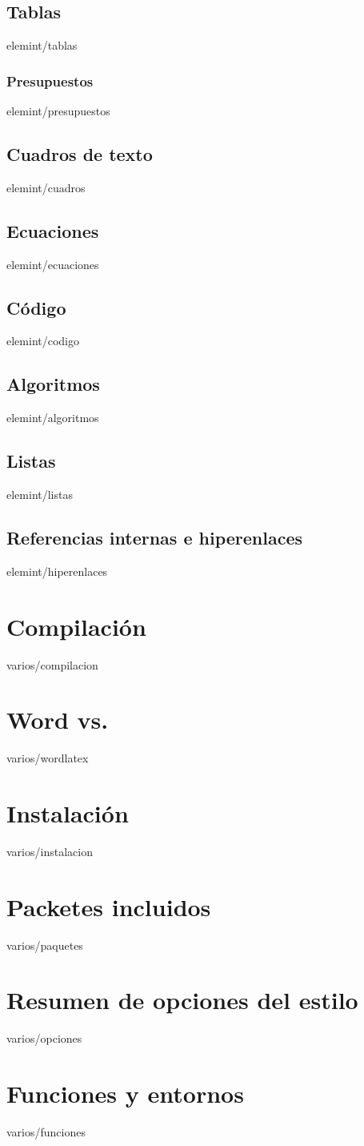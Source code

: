 \documentclass[epsbased,copyright,final,printable,covers,extendedindex,firstnumbered,tfg,gnuplot]{tfgtfmthesisuam}
\begin{document}
  \section{Tablas\label{SEC:TABLAS}}{elemint/tablas}
    \subsection{Presupuestos\label{SS:PRESUPUESTOS}}{elemint/presupuestos}
  \section{Cuadros de texto\label{SEC:CUADROS}}{elemint/cuadros}
  \section{Ecuaciones\label{SEC:ECUACIONES}}{elemint/ecuaciones}
  \section{Código\label{SEC:CODIGO}}{elemint/codigo}
  \section{Algoritmos\label{SEC:ALGORITMOS}}{elemint/algoritmos}
  \section{Listas\label{SEC:LISTAS}}{elemint/listas}
  \section{Referencias internas e hiperenlaces\label{SEC:HIPERENLACES}}{elemint/hiperenlaces}
\chapter{Compilación\label{CAP:COMPILACION}}{varios/compilacion}

\appendix

\chapter{Word\textsuperscript{\textregistered} vs. \LaTeXe\label{CAP:WORDLATEX}}{varios/wordlatex}
\chapter{Instalación\label{CAP:INSTALACION}}{varios/instalacion}
\chapter{Packetes incluidos\label{CAP:PAQUETES}}{varios/paquetes}
\chapter{Resumen de opciones del estilo\label{CAP:OPCIONES}}{varios/opciones}
\chapter{Funciones y entornos\label{CAP:FUNCENT}}{varios/funciones}
\end{document}
